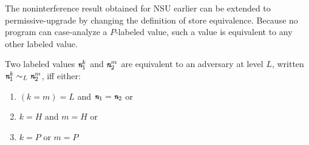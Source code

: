 

The noninterference result obtained for NSU earlier can be extended to
permissive-upgrade by changing the definition of store 
equivalence. Because no program can case-analyze a $P$-labeled value,
such a value is equivalent to any other labeled value.

\begin{mydef}
\label{def:pus}
  Two labeled values $\emph{\texttt{n}}_1^k$ and $\emph{\texttt{n}}_2^m$ are
  equivalent to an adversary at level $L$,
  written $\emph{\texttt{n}}_1^k \sim_L \emph{\texttt{n}}_2^m$, iff either:
  \begin{enumerate}
  \item $(k = m) = L$ and $\emph{\texttt{n}}_1 = \emph{\texttt{n}}_2$ or
  \item $k = H$ and $m = H$ or
  \item $k = P$ or $m = P$
  \end{enumerate}
\end{mydef}

